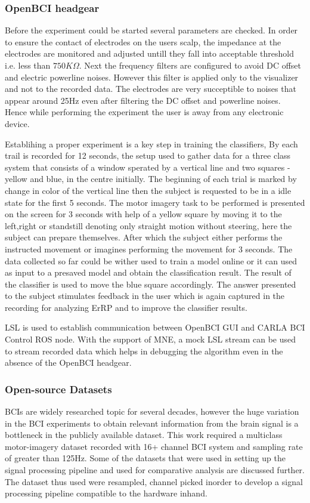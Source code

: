 \subsubsection{OpenBCI headgear}
Before the experiment could be started several parameters are checked. In order to ensure the contact of electrodes on the users scalp, the impedance at the electrodes are
monitored and adjusted untill they fall into acceptable threshold i.e. less than $750K\Omega$. Next the frequency filters are configured to avoid DC offset and electric powerline 
noises. However this filter is applied only to the visualizer and not to the recorded data. The electrodes are very succeptible to noises that appear around 25Hz even after
filtering the DC offset and powerline noises. Hence while performing the experiment the user is away from any electronic device.

Establihing a proper experiment is a key step in training the classifiers, By \cite{} each trail is recorded for 12 seconds, the setup used to gather data for a three class 
system that consists of a window sperated by a vertical line and two squares - yellow and blue,  in the centre initially. The beginning of each trial is marked by change in color of the vertical
line then the subject is requested to be in a idle state for the first 5 seconds. The motor imagery task to be performed is presented on the screen  for 3 seconds with help of a yellow square
by moving it to the left,right or standstill denoting only straight motion without steering, here the subject can prepare themselves. After which the subject either performs the 
instructed movement or imagines performing the movement for 3 seconds. The data collected so far could be wither used to train a model online 
or it can used as input to a presaved model and obtain the classification result. The result of the classifier is used to
move the blue square accordingly. The answer presented to the subject stimulates feedback in the user which is again captured in the 
recording for analyzing ErRP and to improve the classifier results.

LSL is used to establish communication between OpenBCI GUI and CARLA BCI Control ROS node. With the support of MNE, a mock LSL stream can be used to stream recorded data
 which helps in debugging the algorithm even in the absence of the OpenBCI headgear.

\subsubsection{Open-source Datasets}
    BCIs are widely researched topic for several decades, however the huge variation in the BCI experiments to obtain relevant information from the brain signal is a bottleneck
in the publicly available dataset. This work required a multiclass motor-imagery dataset recorded with 16+ channel BCI system and sampling rate of greater than 125Hz. Some of the
datasets that were used in setting up the signal processing pipeline and used for comparative analysis are discussed further. The dataset thus used were resampled, channel picked
inorder to develop a signal processing pipeline compatible to the hardware inhand.

